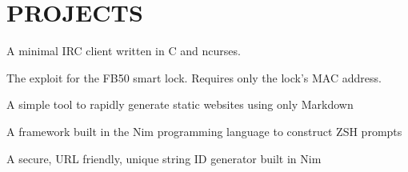 \documentclass[]{resume-openfont}
\begin{document}
\begin{minipage}[t]{0.66\textwidth}

\section{PROJECTS}

A minimal IRC client written in C and ncurses. \\
\sectionsep

The exploit for the FB50 smart lock. Requires only the lock's MAC address. \\
\sectionsep

A simple tool to rapidly generate static websites using only Markdown \\
\sectionsep

A framework built in the Nim programming language to construct ZSH prompts
\sectionsep

A secure, URL friendly, unique string ID generator built in Nim
\sectionsep

\end{minipage} 
\end{document}
